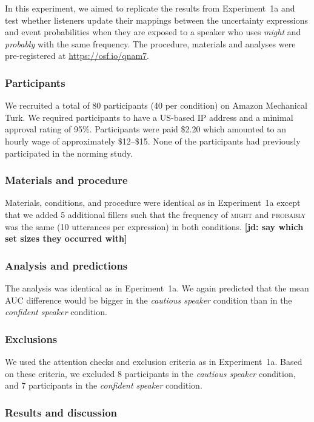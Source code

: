 \documentclass[lucida,biblatex]{sp} %
\newcommand{\jd}[1]{\textcolor{PinkyPurple}{\textbf{[jd: #1]}}}
\begin{document}
In this experiment, we aimed to replicate the results from Experiment~1a and test whether listeners update their 
mappings between the uncertainty expressions and event probabilities when they are exposed to a speaker who
uses \textit{might} and \textit{probably} with the same frequency.  The procedure, materials and analyses were pre-registered at \url{https://osf.io/qnam7}.
\subsubsection{Participants}
We recruited a total of 80 participants (40 per condition) on Amazon Mechanical Turk. 
We required participants to have a US-based IP address and a minimal approval rating 
of 95\%. Participants were paid \$2.20 which amounted to an hourly wage of approximately 
\$12--\$15. None of the participants had previously participated in the norming study.

\subsubsection{Materials and procedure}

Materials, conditions, and procedure were identical as in Experiment~1a except that we added 5 additional fillers such
that the frequency of \textsc{might} and \textsc{probably} was the same (10 utterances per expression) in both conditions. \jd{say which set sizes they occurred with}

\subsubsection{Analysis and predictions}  

The analysis was identical as in Eperiment~1a. We again predicted that the mean AUC difference would be bigger in the 
\emph{cautious speaker} condition than in the \emph{confident speaker} condition.

\subsubsection{Exclusions} We used the attention checks and exclusion criteria as in Experiment~1a.  Based on these criteria, we excluded 8 participants in the \textit{cautious speaker} condition, and 7 participants in the \textit{confident speaker} condition.

\subsubsection{Results and discussion}
\end{document}
